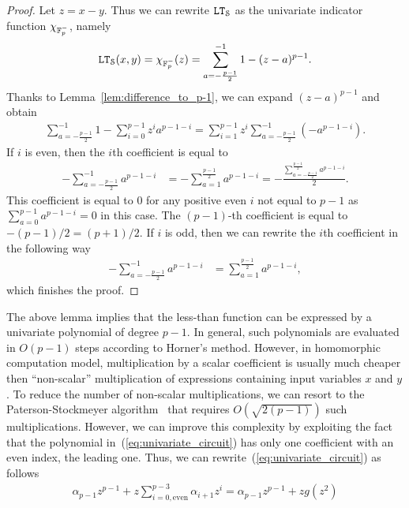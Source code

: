   \begin{proof}
    Let $z = x-y$.
    Thus we can rewrite $\mathtt{LT}_{\mathcal{S}}$ as the univariate indicator function $\chi_{\mathbb{F}_p^-}$, namely
    \begin{align*}
      \mathtt{LT}_{\mathcal{S}}(x,y) = \chi_{\mathbb{F}_p^-}(z) = \sum_{a=-\frac{p-1}{2}}^{-1} 1 - (z - a)^{p-1}.
    \end{align*}
    Thanks to Lemma~\ref{lem:difference_to_p-1}, we can expand $(z-a)^{p-1}$ and obtain
    \begin{align*}
      \sum_{a=-\frac{p-1}{2}}^{-1} 1 - \sum_{i=0}^{p-1} z^i a^{p-1-i}
      = \sum_{i=1}^{p-1} z^i \sum_{a=-\frac{p-1}{2}}^{-1} (-a^{p-1-i}).
    \end{align*}
    If $i$ is even, then the $i$th coefficient is equal to
    \begin{align*}
      -\sum_{a=-\frac{p-1}{2}}^{-1} a^{p-1-i} &= -\sum_{a=1}^{\frac{p-1}{2}} a^{p-1-i} = -\frac{\sum_{a=-\frac{p-1}{2}}^{\frac{p-1}{2}} a^{p-1-i}}{2}.
    \end{align*}
    This coefficient is equal to $0$ for any positive even $i$ not equal to $p-1$ as $\sum_{a=0}^{p-1} a^{p-1-i} = 0$ in this case.
    The $(p-1)$-th coefficient is equal to $-(p-1)/2 = (p+1)/2$.
    If $i$ is odd, then we can rewrite the $i$th coefficient in the following way
    \begin{align*}
      -\sum_{a=-\frac{p-1}{2}}^{-1} a^{p-1-i} &= \sum_{a=1}^{\frac{p-1}{2}} a^{p-1-i},
    \end{align*}
    which finishes the proof.
  \end{proof}
  The above lemma implies that the less-than function can be expressed by a univariate polynomial of degree $p-1$.
  In general, such polynomials are evaluated in $O(p-1)$ steps according to Horner's method.
  However, in homomorphic computation model, multiplication by a scalar coefficient is usually much cheaper then ``non-scalar'' multiplication of expressions containing input variables $x$ and $y$.
  To reduce the number of non-scalar multiplications, we can resort to the Paterson-Stockmeyer algorithm~\cite{SIAM:PS73} that requires $O(\sqrt{2(p-1)})$ such multiplications.
  However, we can improve this complexity by exploiting the fact that the polynomial in~(\ref{eq:univariate_circuit}) has only one coefficient with an even index, the leading one.
  Thus, we can rewrite~(\ref{eq:univariate_circuit}) as follows
  \begin{align*}
    \alpha_{p-1} z^{p-1} + z \sum_{i=0, \text{even}}^{p-3} \alpha_{i+1} z^i =  \alpha_{p-1} z^{p-1} + z g(z^2)
  \end{align*}
